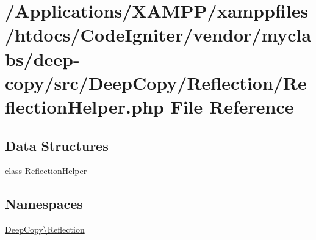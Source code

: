 \hypertarget{_reflection_helper_8php}{}\section{/\+Applications/\+X\+A\+M\+P\+P/xamppfiles/htdocs/\+Code\+Igniter/vendor/myclabs/deep-\/copy/src/\+Deep\+Copy/\+Reflection/\+Reflection\+Helper.php File Reference}
\label{_reflection_helper_8php}
\subsection*{Data Structures}
\begin{DoxyCompactItemize}
\item 
class \mbox{\hyperlink{class_deep_copy_1_1_reflection_1_1_reflection_helper}{Reflection\+Helper}}
\end{DoxyCompactItemize}
\subsection*{Namespaces}
\begin{DoxyCompactItemize}
\item 
 \mbox{\hyperlink{namespace_deep_copy_1_1_reflection}{Deep\+Copy\textbackslash{}\+Reflection}}
\end{DoxyCompactItemize}
